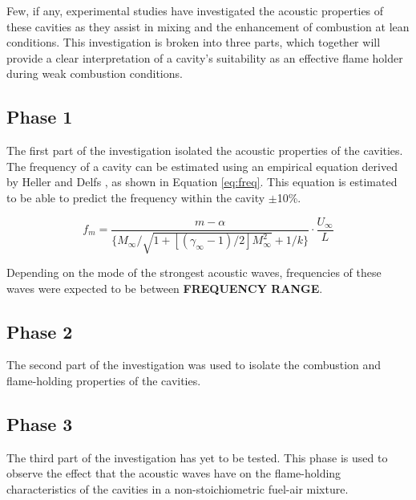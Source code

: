 Few, if any, experimental studies have investigated the acoustic properties of these cavities as they assist in mixing and the enhancement of combustion at lean conditions. This investigation is broken into three parts, which together will provide a clear interpretation of a cavity's suitability as an effective flame holder during weak combustion conditions. 


\subsection{Phase 1}

The first part of the investigation isolated the acoustic properties of the cavities. The frequency of a cavity can be estimated using an empirical equation derived by Heller and Delfs \cite{heller1996letter}, as shown in Equation \ref{eq:freq}. This equation is estimated to be able to predict the frequency within the cavity $\pm$10\%\cite{heller1996letter}.

\begin{equation}
f_m = \frac{m-\alpha}{\{M_{\infty}/\sqrt{1+[(\gamma_{\infty}-1)/2]M_{\infty}^2}+1/k\}} \cdot \frac{U_\infty}{L}
\label{eq:freq}
\end{equation}

Depending on the mode of the strongest acoustic waves, frequencies of these waves were expected to be between \textbf{FREQUENCY RANGE}. 


\subsection{Phase 2}

The second part of the investigation was used to isolate the combustion and flame-holding properties of the cavities.



\subsection{Phase 3}

The third part of the investigation has yet to be tested. This phase is used to observe the effect that the acoustic waves have on the flame-holding characteristics of the cavities in a non-stoichiometric fuel-air mixture. 





